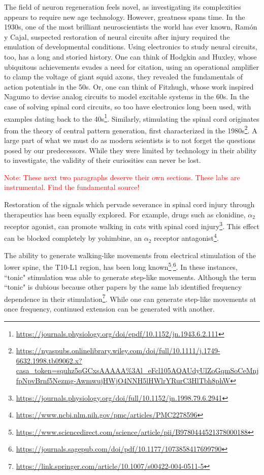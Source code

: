 \documentclass[12pt]{report}
\begin{document}
The field of neuron regeneration feels novel, as investigating its complexities appears to require new age technology. However, greatness spans time. In the 1930s, one of the most brilliant neuroscientists the world has ever known, Ramón y Cajal, suspected restoration of neural circuits after injury required the emulation of developmental conditions. Using electronics to study neural circuits, too, has a long and storied history. One can think of Hodgkin and Huxley, whose ubiquitous achievements evades a need for citation, using an operational amplifier to clamp the voltage of giant squid axons, they revealed the fundamentals of action potentials in the 50s. Or, one can think of Fitzhugh, whose work inspired Nagumo to devise analog circuits to model excitable systems in the 60s. In the case of solving spinal cord circuits, so too have electronics long been used, with examples dating back to the 40s\footnote{\url{https://journals.physiology.org/doi/epdf/10.1152/jn.1943.6.2.111}}. Similarly, stimulating the spinal cord originates from the theory of central pattern generation, first characterized in the 1980s\footnote{\url{https://nyaspubs.onlinelibrary.wiley.com/doi/full/10.1111/j.1749-6632.1998.tb09062.x?casa_token=squhz5qGCxsAAAAA\%3Al_eFcl105AQAUdyUlZoGqmSoCeMnjfpNpvBrnf5Nezmg-AwmwujHWjO4NNH5lHWlrYRurC3HlTbh8phW}}. A large part of what we must do as modern scientists is to not forget the questions posed by our predecessors. While they were limited by technology in their ability to investigate, the validity of their curiosities can never be lost.\newline



\textcolor{red}{Note: These next two paragraphs deserve their own sections. These labs are instrumental. Find the fundamental source!}

Restoration of the signals which pervade severance in spinal cord injury through therapeutics has been equally explored. For example, drugs such as clonidine, $\alpha_2$ receptor agonist, can promote walking in cats with spinal cord injury\footnote{\url{https://journals.physiology.org/doi/full/10.1152/jn.1998.79.6.2941}}. This effect can be blocked completely by yohimbine, an $\alpha_2$ receptor antagonist\footnote{\url{https://www.ncbi.nlm.nih.gov/pmc/articles/PMC2278596}}.\newline

The ability to generate walking-like movements from electrical stimulation of the lower spine, the T10-L1 region, has been long known\footnote{\url{https://www.sciencedirect.com/science/article/pii/B9780444521378000188}}$^,$\footnote{\url{https://journals.sagepub.com/doi/pdf/10.1177/1073858417699790}}. In these instances, ``tonic" stimulation was able to generate step-like movements. Although the term ``tonic" is dubious because other papers by the same lab identified frequency dependence in their stimulation\footnote{\url{https://link.springer.com/article/10.1007/s00422-004-0511-5}}. While one can generate step-like movements at once frequency, continued extension can be generated with another. 
\end{document}
